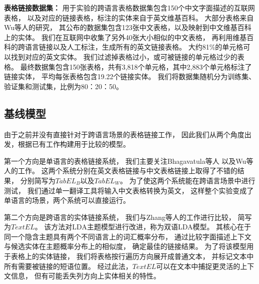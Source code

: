 \textbf{表格链接数据集：}
用于实验的跨语言表格数据集包含150个中文字面描述的互联网表格，
以及对应的链接表格，标注的实体来自于英文维基百科。
大部分表格来自Wu等人的研究\parencite{wu2016entity}，
其公布的数据集包含123张中文表格，以及映射到中文维基百科上的实体。
我们在互联网中收集了另外40张大小相似的中文表格，
再利用维基百科的跨语言链接以及人工标注，生成所有的英文链接表格。
大约81\%的单元格可以找到对应的英文实体。
我们过滤掉表格过小，或可被链接的单元格过少的表格。
最终数据集包含150张表格，共有3,818个单元格，其中2,883个单元格标注了链接实体，
平均每张表格包含19.22个链接实体。
我们将数据集随机分为训练集、验证集和测试集，比例为80：20：50。


\subsection{基线模型}
\label{exp:tabel-soat}

由于之前并没有直接针对于跨语言场景的表格链接工作，
因此我们从两个角度出发，根据已有工作构建用于比较的模型。

第一个方向是单语言的表格链接系统，
我们主要关注Bhagavatula等人\cite{bhagavatula2015tabel}
以及Wu等人\cite{wu2016entity}的工作。
这两个系统分别在英文表格链接与中文表格链接上取得了不错的结果，
分别简写为$TabEL_B$以及$TabEL_W$。
为了使这两个系统能在跨语言场景中进行测试，
我们通过单一翻译工具将输入中文表格转换为英文，
这样整个实验变成了单语言的场景，两个系统可以直接运行。

第二个方向是跨语言的实体链接系统，
我们与Zhang等人\cite{zhang2013cross}的工作进行比较，
简写为$TextEL$。
该方法对LDA主题模型\cite{blei2003latent}进行改进，称为双语LDA模型。
其核心在于同一个隐含主题具有两个不同语言上的词汇概率分布，
通过比较字面描述上下文与候选实体在主题概率分布上的相似度，
确定最佳的链接结果。
为了将该模型用于表格上的实体链接，
我们将表格按行遍历方向展开成普通文本，
并标记文本中所有需要被链接的短语位置。
经过此法，$TextEL$可以在文本中捕捉更灵活的上下文信息，
但有可能丢失列方向上实体相关的特性。

